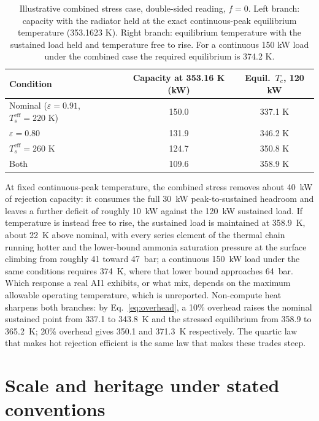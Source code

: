 \documentclass[11pt]{article}
\newcommand{\Tc}{T_c}
\newcommand{\Ts}{T_s^{\mathrm{eff}}}
\newcommand{\eps}{\varepsilon}
\begin{document}
\begin{table}[ht]
\centering
\begin{tabular}{lcc}
\toprule
Condition & Capacity at 353.16 K (kW) & Equil.\ $\Tc$, 120 kW \\
\midrule
Nominal ($\eps=0.91$, $\Ts=220$ K) & 150.0 & 337.1 K \\
$\eps = 0.80$ & 131.9 & 346.2 K \\
$\Ts = 260$ K & 124.7 & 350.8 K \\
Both & 109.6 & 358.9 K \\
\bottomrule
\end{tabular}
\caption{Illustrative combined stress case, double-sided reading, $f=0$. Left branch: capacity with the radiator held at the exact continuous-peak equilibrium temperature (353.1623 K). Right branch: equilibrium temperature with the sustained load held and temperature free to rise. For a continuous 150 kW load under the combined case the required equilibrium is 374.2 K.}
\label{tab:twobranch}
\end{table}

At fixed continuous-peak temperature, the combined stress removes about 40~kW of rejection capacity: it consumes the full 30~kW peak-to-sustained headroom and leaves a further deficit of roughly 10~kW against the 120~kW sustained load. If temperature is instead free to rise, the sustained load is maintained at 358.9~K, about 22~K above nominal, with every series element of the thermal chain running hotter and the lower-bound ammonia saturation pressure at the surface climbing from roughly 41 toward 47~bar; a continuous 150~kW load under the same conditions requires 374~K, where that lower bound approaches 64~bar. Which response a real AI1 exhibits, or what mix, depends on the maximum allowable operating temperature, which is unreported. Non-compute heat sharpens both branches: by Eq.~\eqref{eq:overhead}, a 10\% overhead raises the nominal sustained point from 337.1 to 343.8~K and the stressed equilibrium from 358.9 to 365.2~K; 20\% overhead gives 350.1 and 371.3~K respectively. The quartic law that makes hot rejection efficient is the same law that makes these trades steep.

\section{Scale and heritage under stated conventions}\label{sec:scaleup}
\end{document}

